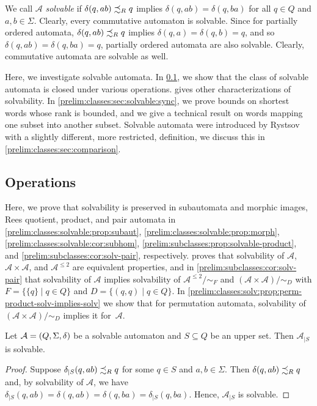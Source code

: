 
We call $\mathcal A$ \emph{solvable}
if $\delta(q, ab) \precsim_R q$ implies $\delta(q, ab) = \delta(q, ba)$
for all $q \in Q$ and $a,b \in \Sigma$.
Clearly, every commutative automaton is solvable.
Since for partially ordered automata,
$\delta(q, ab) \precsim_R q$
implies $\delta(q, a) = \delta(q, b) = q$,
and so $\delta(q, ab) = \delta(q, ba) = q$,
partially ordered automata are also solvable. Clearly, commutative automata
are solvable as well.

Here, we investigate solvable automata. In \cref{prelim:classes:sec:solvable:operations}, 
we show that the class of solvable automata
is closed under various operations. 
gives other characterizations of solvability.
In \cref{prelim:classes:sec:solvable:sync}, 
we prove bounds on shortest words whose rank is bounded,
and we give a technical result on words mapping one subset into another subset.
Solvable automata were introduced by
Rystsov~\cite{Rystsov97} with a slightly different, more restricted,
definition, we discuss this in \cref{prelim:classes:sec:comparison}.

\subsection{Operations}
\label{prelim:classes:sec:solvable:operations}

Here, we prove that solvability
is preserved 
in subautomata and morphic images, Rees quotient, product, and pair automata
in \cref{prelim:classes:solvable:prop:subaut},
\cref{prelim:classes:solvable:prop:morph}, 
\cref{prelim:classes:solvable:cor:subhom},
\cref{prelim:subclasses:prop:solvable-product}, and
\cref{prelim:subclasses:cor:solv-pair}, respectively.
proves that 
solvability of $\mathcal A$, $\mathcal A \times \mathcal A$, and $\mathcal A^{\le 2}$ are equivalent properties,
and in \cref{prelim:subclasses:cor:solv-pair} 
that solvability of $\mathcal A$
implies solvability of 
 $\mathcal A^{\le 2} / {\sim_F}$
and 
$( \mathcal A \times \mathcal A ) / {\sim_D}$
with $F = \{ \{q\} \mid q \in Q \}$
and $D = \{ (q,q) \mid q \in Q \}$.
In \cref{prelim:classes:solv:prop:perm-product-solv-implies-solv}
we show that for permutation automata,
solvability of~$( \mathcal A \times \mathcal A ) / {\sim_D}$
implies it for~$\mathcal A$.

\begin{proposition} \label{prelim:classes:solvable:prop:subaut}
	Let $\mathcal A = (Q, \Sigma, \delta)$ be a solvable automaton
	and $S \subseteq Q$ be an upper set.
Then $\mathcal A_{|S}$ is solvable.	
\end{proposition}
\begin{proof}
	Suppose $\delta_{|S}(q, ab) \precsim_R q$
	for some $q \in S$ and $a,b \in \Sigma$.
	Then $\delta(q, ab) \precsim_R q$
	and, by solvability of $\mathcal A$,
	we have $\delta_{|S}(q, ab) = \delta(q, ab) = \delta(q, ba) = \delta_{|S}(q, ba)$.
	Hence, $\mathcal A_{|S}$ is solvable.
\end{proof} 

